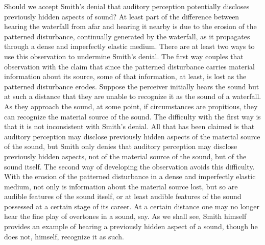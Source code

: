 Should we accept Smith's denial that auditory perception potentially discloses previously hidden aspects of sound? At least part of the difference between hearing the waterfall from afar and hearing it nearby is due to the erosion of the patterned disturbance, continually generated by the waterfall, as it propagates through a dense and imperfectly elastic medium. There are at least two ways to use this observation to undermine Smith's denial. The first way couples that observation with the claim that since the patterned disturbance carries material information about its source, some of that information, at least, is lost as the patterned disturbance erodes. Suppose the perceiver initially hears the sound but at such a distance that they are unable to recognize it as the sound of a waterfall. As they approach the sound, at some point, if circumstances are propitious, they can recognize the material source of the sound. The difficulty with the first way is that it is not inconsistent with Smith's denial. All that has been claimed is that auditory perception may disclose previously hidden aspects of the material source of the sound, but Smith only denies that auditory perception may disclose previously hidden aspects, not of the material source of the sound, but of the sound itself. The second way of developing the observation avoids this difficulty. With the erosion of the patterned disturbance in a dense and imperfectly elastic medium, not only is information about the material source lost, but so are audible features of the sound itself, or at least audible features of the sound possessed at a certain stage of its career. At a certain distance one may no longer hear the fine play of overtones in a sound, say. As we shall see, Smith himself provides an example of hearing a previously hidden aspect of a sound, though he does not, himself, recognize it as such.

